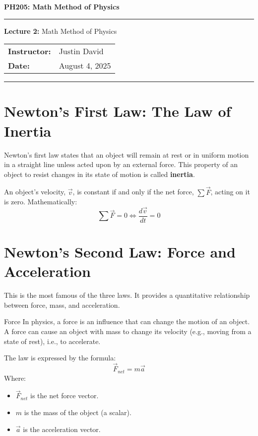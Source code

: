 \documentclass[11pt, a4paper]{article}
\newcommand{\courseTitle}{Math Method of Physics}
\newcommand{\lectureNumber}{XX}
\newcommand{\lectureTopic}{Default Lecture Topic}
\newcommand{\lectureDate}{\today}
\renewcommand{\maketitle}{
    \begin{center}
        \vspace*{1cm}
        {\Huge\bfseries \courseTitle}
        \vspace{0.5cm}
        
        \hrule
        \vspace{0.5cm}
        
        {\Large \textbf{Lecture \lectureNumber:} \lectureTopic}
        \vspace{0.5cm}
        
        \begin{tabular}{ll}
            \bfseries Instructor: & \instructorName \\
            \bfseries Date: & \lectureDate \\
        \end{tabular}
        
        \vspace{0.5cm}
        \hrule
        \vspace{1cm}
    \end{center}
}
\renewcommand{\courseTitle}{PH205: Math Method of Physics}
\renewcommand{\lectureNumber}{2}
\renewcommand{\lectureTopic}{Math Method of Physics}
\newcommand{\instructorName}{Justin David}
\renewcommand{\lectureDate}{August 4, 2025}
\renewcommand{\instructorName}{Justin David}
\begin{document}
\maketitle %

\tableofcontents %
\newpage


\section{Newton's First Law: The Law of Inertia}

Newton's first law states that an object will remain at rest or in uniform motion in a straight line unless acted upon by an external force. This property of an object to resist changes in its state of motion is called \textbf{inertia}.

\begin{keypoint}
    An object's velocity, $\vec{v}$, is constant if and only if the net force, $\sum \vec{F}$, acting on it is zero. Mathematically:
    $$ \sum \vec{F} = 0 \iff \frac{d\vec{v}}{dt} = 0 $$
\end{keypoint}

\section{Newton's Second Law: Force and Acceleration}

This is the most famous of the three laws. It provides a quantitative relationship between force, mass, and acceleration.

\begin{definition}{Force}
    In physics, a force is an influence that can change the motion of an object. A force can cause an object with mass to change its velocity (e.g., moving from a state of rest), i.e., to accelerate.
\end{definition}

The law is expressed by the formula:
$$ \vec{F}_{net} = m\vec{a} $$
Where:
\begin{itemize}
    \item $\vec{F}_{net}$ is the net force vector.
    \item $m$ is the mass of the object (a scalar).
    \item $\vec{a}$ is the acceleration vector.
\end{itemize}
\end{document}
